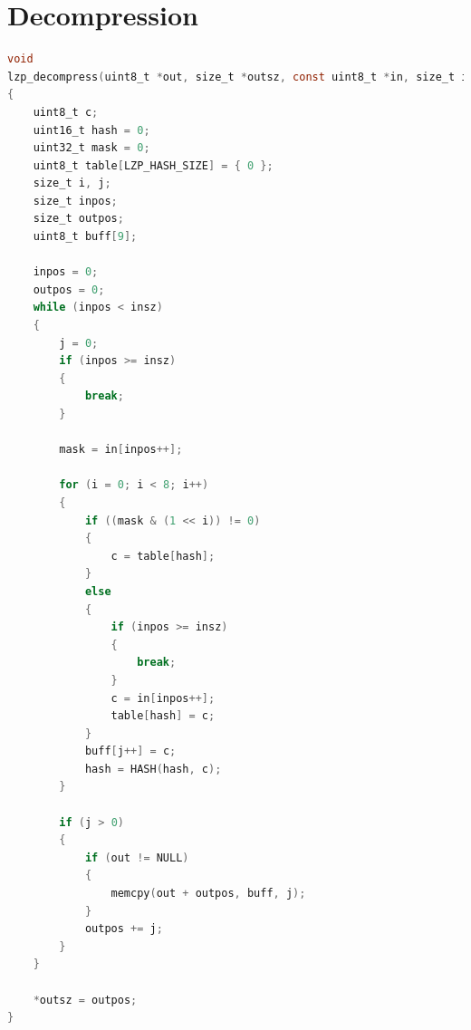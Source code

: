 \documentclass[a4paper, 12pt, openright, english]{scrbook}
\begin{document}
	\section{Decompression}
	\begin{lstlisting}[language=C]
void
lzp_decompress(uint8_t *out, size_t *outsz, const uint8_t *in, size_t insz)
{
	uint8_t c;
	uint16_t hash = 0;
	uint32_t mask = 0;
	uint8_t table[LZP_HASH_SIZE] = { 0 };
	size_t i, j;
	size_t inpos;
	size_t outpos;
	uint8_t buff[9];

	inpos = 0;
	outpos = 0;
	while (inpos < insz)
	{
		j = 0;
		if (inpos >= insz)
		{
			break;
		}

		mask = in[inpos++];

		for (i = 0; i < 8; i++)
		{
			if ((mask & (1 << i)) != 0)
			{
				c = table[hash];
			}
			else
			{
				if (inpos >= insz)
				{
					break;
				}
				c = in[inpos++];
				table[hash] = c;
			}
			buff[j++] = c;
			hash = HASH(hash, c);
		}

		if (j > 0)
		{
			if (out != NULL)
			{
				memcpy(out + outpos, buff, j);
			}
			outpos += j;
		}
	}

	*outsz = outpos;
}
	\end{lstlisting}
\end{document}
